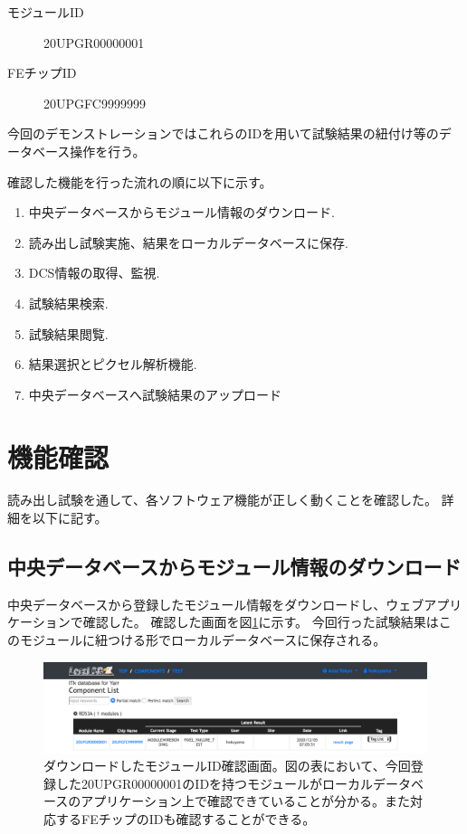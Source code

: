 \begin{description}
  \item[モジュールID] 20UPGR00000001
  \item[FEチップID] 20UPGFC9999999
\end{description}
今回のデモンストレーションではこれらのIDを用いて試験結果の紐付け等のデータベース操作を行う。

確認した機能を行った流れの順に以下に示す。
\begin{enumerate}
  \item 中央データベースからモジュール情報のダウンロード.
  \item 読み出し試験実施、結果をローカルデータベースに保存.
  \item DCS情報の取得、監視.
  \item 試験結果検索.
  \item 試験結果閲覧.
  \item 結果選択とピクセル解析機能.
  \item 中央データベースへ試験結果のアップロード
\end{enumerate}

\clearpage
\section{機能確認}
読み出し試験を通して、各ソフトウェア機能が正しく動くことを確認した。
詳細を以下に記す。

\subsection{中央データベースからモジュール情報のダウンロード}
中央データベースから登録したモジュール情報をダウンロードし、ウェブアプリケーションで確認した。
確認した画面を図\ref{demo_download_SCC}に示す。
今回行った試験結果はこのモジュールに紐つける形でローカルデータベースに保存される。

\begin{figure}[bpt]\centering
\includegraphics[width=16cm]{./demo_download_SCC.pdf}
\caption[ダウンロードしたモジュールID確認画面]{ダウンロードしたモジュールID確認画面。図の表において、今回登録した20UPGR00000001のIDを持つモジュールがローカルデータベースのアプリケーション上で確認できていることが分かる。また対応するFEチップのIDも確認することができる。}
\label{demo_download_SCC}
\end{figure}

